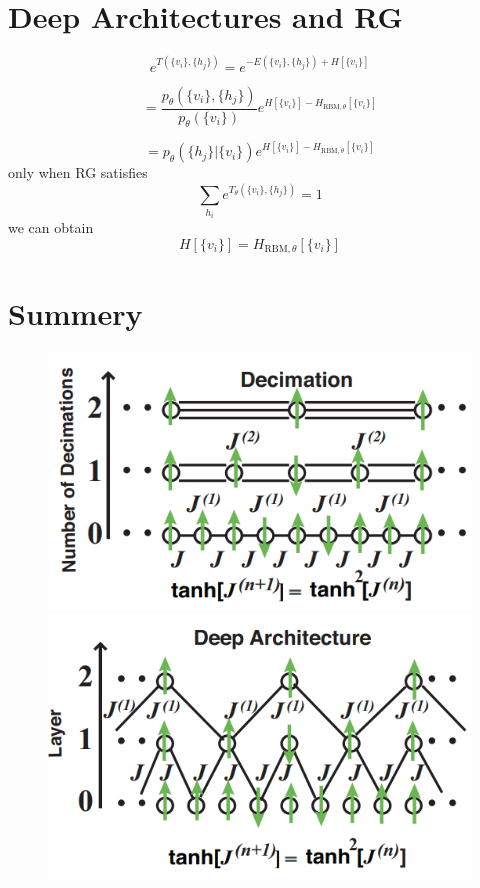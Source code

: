 \documentclass{antclass}
\begin{document}
\pagebreak

\section{Deep Architectures and RG}

\[
e^{T(\{v_i\}, \{h_j\})} = e^{-E(\{v_i\}, \{h_j\}) + H[\{v_i\}]}
\]

\[
= \frac{p_\theta(\{v_i\}, \{h_j\})}{p_\theta(\{v_i\})} e^{H[\{v_i\}] - H_{\text{RBM}, \theta}[\{v_i\}]}
\]

\[
= p_\theta(\{h_j\}|\{v_i\}) e^{H[\{v_i\}] - H_{\text{RBM}, \theta}[\{v_i\}]}
\]
only when RG satisfies
\[
\sum_{h_i}e^{T_\theta(\{v_i\}, \{h_j\})} = 1
\]
we can obtain
\[
H[\{v_i\}] = H_{\text{RBM}, \theta}[\{v_i\}]
\]

\pagebreak

\section{Summery}

\begin{figure}[h!]
    \centering
    \begin{minipage}{0.45\textwidth}
        \centering
        \includegraphics[width=\linewidth]{pics/Renormalization/Decimation.png}
    \end{minipage} \hfill
    \begin{minipage}{0.45\textwidth}
        \centering
        \includegraphics[width=\linewidth]{pics/Renormalization/DeepLayers.png}
    \end{minipage}
\end{figure}
\end{document}
